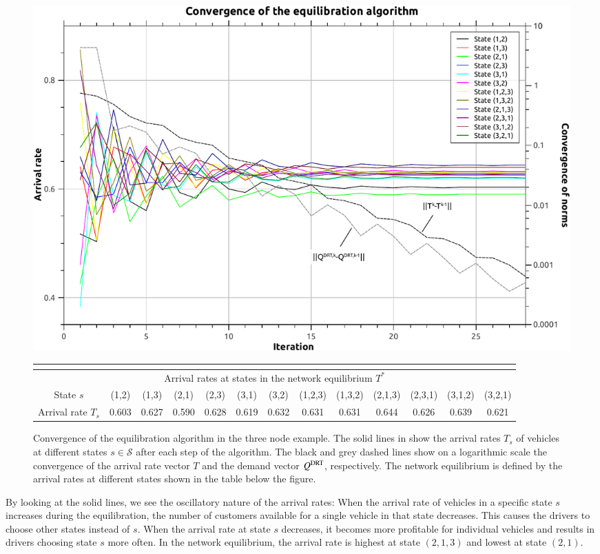 \documentclass[dissertation,draft*]{aaltoseries}
\begin{document}
\begin{figure}[ht]
\begin{center}
\includegraphics[width=0.9\columnwidth]{convergence01}
{\tiny
\begin{tabular}{|c|cccccccccccc|}
\multicolumn{13}{c}{} \\
\hline
\multicolumn{13}{|c|}{Arrival rates at states in the network equilibrium $T^*$} \\
\hline
State $s$ & (1,2) & (1,3) & (2,1) & (2,3) & (3,1) & (3,2) & (1,2,3) & (1,3,2) & (2,1,3) & (2,3,1) & (3,1,2) & (3,2,1) \\
\hline
Arrival rate $T_s$ & 0.603 & 0.627 & 0.590 & 0.628 & 0.619 & 0.632 & 0.631 & 0.631 & 0.644 & 0.626 & 0.639 & 0.621 \\
\hline
\end{tabular}
}
\caption{Convergence of the equilibration algorithm in the three node example. The solid lines in show the
arrival rates $T_s$ of vehicles at different states $s \in \mathcal{S}$ after each step of the algorithm. 
The black and grey dashed lines show on a logarithmic scale 
the convergence of the arrival rate vector $T$ and the demand vector $Q^{\rm DRT}$, respectively.
The network equilibrium is defined by the
arrival rates at different states shown in the table below the figure.}
\label{convergence01}
\end{center}
\end{figure}

By looking at the solid lines, we see the oscillatory nature of the arrival rates: When the
arrival rate of vehicles in a specific state $s$ increases during the equilibration, the number 
of customers available for a single vehicle in that state decreases. 
This causes the drivers to choose other states instead of $s$.
When the arrival rate at state $s$ decreases, it becomes more profitable for individual vehicles
and results in drivers choosing state $s$ more often. In the network equilibrium, the arrival rate is highest
at state $(2,1,3)$ and lowest at state $(2,1)$.
\end{document}
